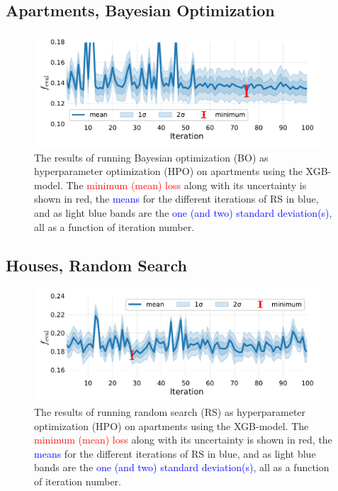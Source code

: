 \subsection*{Apartments, Bayesian Optimization}
\begin{figure}[h!]
  \includegraphics[width=0.95\textwidth, trim=0 0 0 0, clip]{figures/housing/Ejerlejlighed_v19_cut_all_Ncols_all_xgb_score_over_time_BO.pdf}
  \caption[Bayesian Optimization Results as a Function of Iteration for Apartments]
          {The results of running Bayesian optimization (BO) as hyperparameter optimization (HPO) on apartments using the XGB-model. The \textcolor{red}{minimum (mean) loss} along with its uncertainty is shown in red, the \textcolor{blue}{means} for the different iterations of RS in blue, and as light blue bands are the \textcolor{blue}{one (and two) standard deviation(s)}, all as a function of iteration number.} 
  \label{fig:h:CV_res_BO_uncertainties_ejer}
\end{figure}


\FloatBarrier
\subsection*{Houses, Random Search}
\begin{figure}
  \centerfloat
  \includegraphics[width=0.95\textwidth, trim=10 20 10 10, clip]{figures/housing/Villa_v19_cut_all_Ncols_all_xgb_score_over_time_random.pdf}
  \caption[Random Search Results as a Function of Iteration for Houses]
          {The results of running random search (RS) as hyperparameter optimization (HPO) on apartments using the XGB-model. The \textcolor{red}{minimum (mean) loss} along with its uncertainty is shown in red, the \textcolor{blue}{means} for the different iterations of RS in blue, and as light blue bands are the \textcolor{blue}{one (and two) standard deviation(s)}, all as a function of iteration number.} 
\end{figure}


